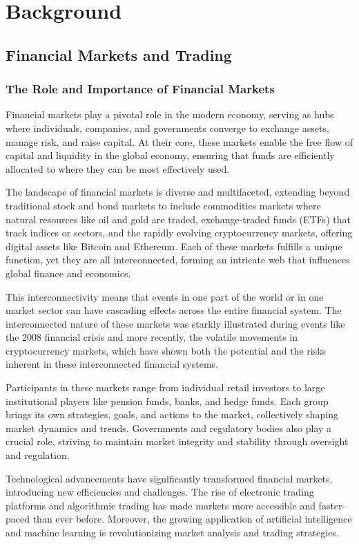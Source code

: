 \section{Background}

\subsection{Financial Markets and Trading}

\subsubsection{The Role and Importance of Financial Markets}
Financial markets play a pivotal role in the modern economy, serving as hubs where individuals, companies, and governments converge to exchange assets, manage risk, and raise capital. At their core, these markets enable the free flow of capital and liquidity in the global economy, ensuring that funds are efficiently allocated to where they can be most effectively used.

The landscape of financial markets is diverse and multifaceted, extending beyond traditional stock and bond markets to include commodities markets where natural resources like oil and gold are traded, exchange-traded funds (ETFs) that track indices or sectors, and the rapidly evolving cryptocurrency markets, offering digital assets like Bitcoin and Ethereum. Each of these markets fulfills a unique function, yet they are all interconnected, forming an intricate web that influences global finance and economics.

This interconnectivity means that events in one part of the world or in one market sector can have cascading effects across the entire financial system. The interconnected nature of these markets was starkly illustrated during events like the 2008 financial crisis and more recently, the volatile movements in cryptocurrency markets, which have shown both the potential and the risks inherent in these interconnected financial systems.

Participants in these markets range from individual retail investors to large institutional players like pension funds, banks, and hedge funds. Each group brings its own strategies, goals, and actions to the market, collectively shaping market dynamics and trends. Governments and regulatory bodies also play a crucial role, striving to maintain market integrity and stability through oversight and regulation.

Technological advancements have significantly transformed financial markets, introducing new efficiencies and challenges. The rise of electronic trading platforms and algorithmic trading has made markets more accessible and faster-paced than ever before. Moreover, the growing application of artificial intelligence and machine learning is revolutionizing market analysis and trading strategies.

